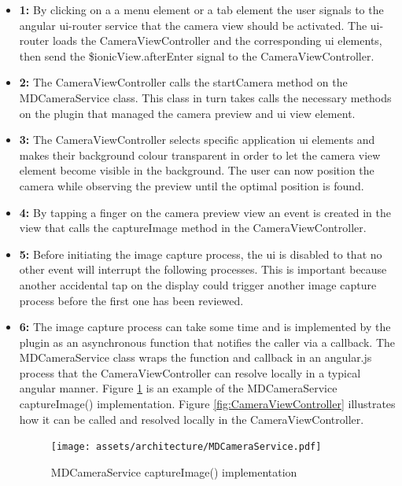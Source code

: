 \begin{itemize}[label={}]
    \item \textbf{1:} By clicking on a a menu element or a tab element the user signals to the angular ui-router service that the camera view should be activated. The ui-router loads the CameraViewController and the corresponding ui elements, then send the \$ionicView.afterEnter signal to the CameraViewController.

    \item \textbf{2:} The CameraViewController calls the startCamera method on the MDCameraService class. This class in turn takes calls the necessary methods on the plugin that managed the camera preview and ui view element.

    \item \textbf{3:} The CameraViewController selects specific application ui elements and makes their background colour transparent in order to let the camera view element become visible in the background. The user can now position the camera while observing the preview until the optimal position is found.

    \item \textbf{4:} By tapping a finger on the camera preview view an event is created in the view that calls the captureImage method in the CameraViewController.

    \item \textbf{5:} Before initiating the image capture process, the ui is disabled to that no other event will interrupt the following processes. This is important because another accidental tap on the display could trigger another image capture process before the first one has been reviewed.

    \item \textbf{6:} The image capture process can take some time and is implemented by the plugin as an asynchronous function that notifies the caller via a callback. The MDCameraService class wraps the function and callback in an angular.js process that the CameraViewController can resolve locally in a typical angular manner. Figure \ref{fig:MDCameraService} is an example of the MDCameraService captureImage() implementation. Figure \ref{fig:CameraViewController} illustrates how it can be called and resolved locally in the CameraViewController.

        \begin{figure}[H]
            \centering
            \texttt{[image: assets/architecture/MDCameraService.pdf]}
            \caption{MDCameraService captureImage() implementation}
            \label{fig:MDCameraService}
        \end{figure}


\end{itemize}
